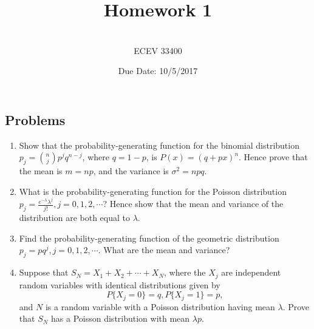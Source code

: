 \documentclass{article}
\begin{document}

\title{Homework 1} %
\author{ \\ECEV 33400} %
\date{Due Date: 10/5/2017} %

\maketitle

%
%

\subsection*{Problems} 

\begin{enumerate}

\item Show that the probability-generating function for the binomial distribution $p_j = \binom{n}{j} p^j q^{n-j}$, where $ q = 1 - p$, is $P(x) = (q + px)^n$. Hence prove that the mean is $m = np$, and the variance is $\sigma^2 = npq$. 

\item What is the probability-generating function for the Poisson distribution $p_j = \frac{e^{-\lambda} \lambda^j}{j!}, j = 0, 1, 2, \cdots$? Hence show that the mean and variance of the distribution are both equal to $\lambda$. 

\item Find the probability-generating function of the geometric distribution $p_j = pq^j, j = 0, 1, 2, \cdots$. What are the mean and variance? 

\item Suppose that $S_N = X_1 + X_2 + \cdots + X_N$, where the $X_j$ are independent random variables with identical distributions given by $$P \{ X_j = 0 \} = q, P \{ X_j = 1 \} = p,$$ and $N$ is a random variable with a Poisson distribution having mean $\lambda$. Prove that $S_N$ has a Poisson distribution with mean $\lambda p$. 
\end{enumerate}
\end{document}
